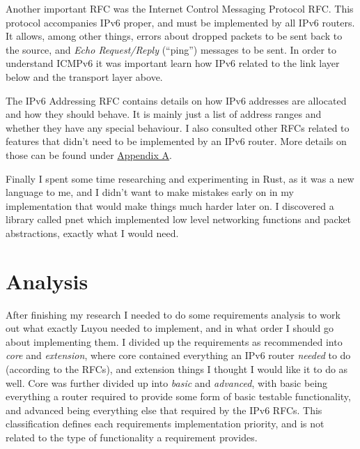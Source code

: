 \documentclass[12pt,a4paper,twoside,openright]{report}
\begin{document}
\bigskip

Another important RFC was the Internet Control Messaging Protocol RFC\cite{icmpv6_rfc}.  This protocol accompanies IPv6 proper, and must be implemented by all IPv6 routers.  It allows, among other things, errors about dropped packets to be sent back to the source, and \textit{Echo Request/Reply} (``ping'') messages to be sent.  In order to understand ICMPv6 it was important learn how IPv6 related to the link layer below and the transport layer above.

\bigskip

The IPv6 Addressing RFC\cite{ipv6_rfc_adr} contains details on how IPv6 addresses are allocated and how they should behave. It is mainly just a list of address ranges and whether they have any special behaviour.  I also consulted other RFCs related to features that didn't need to be implemented by an IPv6 router\cite{slaac_rfc}\cite{dhcpv6_rfc}\cite{ndp_rfc}. More details on those can be found under \hyperref[appendix::requirements]{Appendix A}.

\bigskip

Finally I spent some time researching and experimenting in Rust\cite{rust}, as it was a new language to me, and I didn't want to make mistakes early on in my implementation that would make things much harder later on.  I discovered a library called pnet\cite{pnet_rust} which implemented low level networking functions and packet abstractions, exactly what I would need.

\section{Analysis}
\label{sec::analysis}

After finishing my research I needed to do some requirements analysis to work out what exactly Luyou needed to implement, and in what order I should go about implementing them.  I divided up the requirements as recommended into \textit{core} and \textit{extension}, where core contained everything an IPv6 router \textit{needed} to do (according to the RFCs), and extension things I thought I would like it to do as well.  Core was further divided up into \textit{basic} and \textit{advanced}, with basic being everything a router required to provide some form of basic testable functionality, and advanced being everything else that required by the IPv6 RFCs.  This classification defines each requirements implementation priority, and is not related to the type of functionality a requirement provides.
\end{document}
